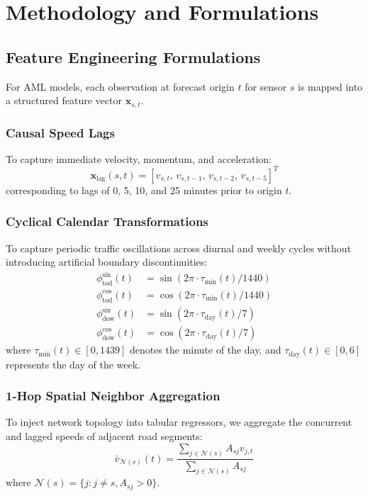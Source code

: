 \documentclass[conference]{IEEEtran}
\begin{document}
\section{Methodology and Formulations}

\subsection{Feature Engineering Formulations}
For AML models, each observation at forecast origin $t$ for sensor $s$ is mapped into a structured feature vector $\mathbf{x}_{s,t}$.

\subsubsection{Causal Speed Lags}
To capture immediate velocity, momentum, and acceleration:
\begin{equation}
\mathbf{x}_{\text{lag}}(s, t) = \left[ v_{s,t}, \, v_{s,t-1}, \, v_{s,t-2}, \, v_{s,t-5} \right]^T
\end{equation}
corresponding to lags of 0, 5, 10, and 25 minutes prior to origin $t$.

\subsubsection{Cyclical Calendar Transformations}
To capture periodic traffic oscillations across diurnal and weekly cycles without introducing artificial boundary discontinuities:
\begin{align}
\phi_{\text{tod}}^{\sin}(t) &= \sin\left( 2\pi \cdot \tau_{\text{min}}(t) / 1440 \right) \\
\phi_{\text{tod}}^{\cos}(t) &= \cos\left( 2\pi \cdot \tau_{\text{min}}(t) / 1440 \right) \\
\phi_{\text{dow}}^{\sin}(t) &= \sin\left( 2\pi \cdot \tau_{\text{day}}(t) / 7 \right) \\
\phi_{\text{dow}}^{\cos}(t) &= \cos\left( 2\pi \cdot \tau_{\text{day}}(t) / 7 \right)
\end{align}
where $\tau_{\text{min}}(t) \in [0, 1439]$ denotes the minute of the day, and $\tau_{\text{day}}(t) \in [0, 6]$ represents the day of the week.

\subsubsection{1-Hop Spatial Neighbor Aggregation}
To inject network topology into tabular regressors, we aggregate the concurrent and lagged speeds of adjacent road segments:
\begin{equation}
\bar{v}_{\mathcal{N}(s)}(t) = \frac{\sum_{j \in \mathcal{N}(s)} A_{sj} v_{j,t}}{\sum_{j \in \mathcal{N}(s)} A_{sj}}
\end{equation}
where $\mathcal{N}(s) = \{j : j \ne s, A_{sj} > 0\}$.
\end{document}
